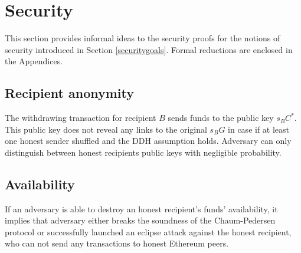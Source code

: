 \documentclass[a4paper]{article}
\theoremstyle{definition}
\begin{document}
\section{Security}
This section provides informal ideas to the security proofs for the notions of security introduced in Section \ref{securitygoals}. Formal reductions are enclosed in the Appendices.

\subsection{Recipient anonymity}
The withdrawing transaction for recipient $B$ sends funds to the public key $s_{B}C^{*}$. This public key does not reveal any links to the original $s_{B}G$ in case if at least one honest sender shuffled and the DDH assumption holds. Adversary can only distinguish between honest recipients public keys with negligible probability.
\subsection{Availability}
If an adversary is able to destroy an honest recipient's funds' availability, it implies that adversary either breaks the soundness of the Chaum-Pedersen protocol or successfully launched an eclipse attack against the honest recipient, who can not send any transactions to honest Ethereum peers. 
\end{document}
